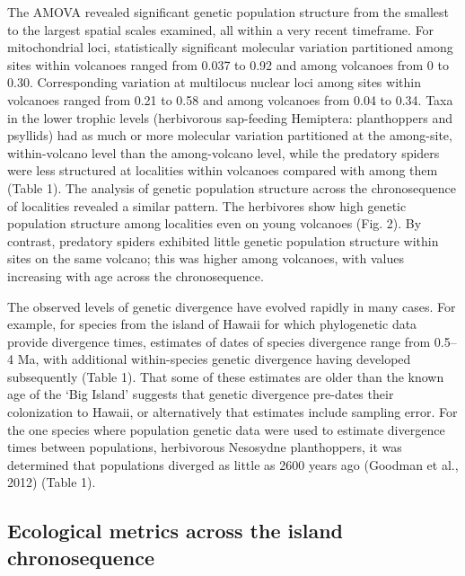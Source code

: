 The AMOVA revealed significant genetic population structure from the
smallest to the largest spatial scales examined, all within a very
recent timeframe. For mitochondrial loci, statistically significant
molecular variation partitioned among sites within volcanoes ranged
from 0.037 to 0.92 and among volcanoes from 0 to 0.30. Corresponding
variation at multilocus nuclear loci among sites within volcanoes
ranged from 0.21 to 0.58 and among volcanoes from 0.04 to 0.34. Taxa
in the lower trophic levels (herbivorous sap-feeding Hemiptera:
planthoppers and psyllids) had as much or more molecular variation
partitioned at the among-site, within-volcano level than the
among-volcano level, while the predatory spiders were less structured
at localities within volcanoes compared with among them (Table 1). The
analysis of genetic population structure across the chronosequence of
localities revealed a similar pattern. The herbivores show high
genetic population structure among localities even on young volcanoes
(Fig. 2). By contrast, predatory spiders exhibited little genetic
population structure within sites on the same volcano; this was higher
among volcanoes, with values increasing with age across the
chronosequence.

The observed levels of genetic divergence have evolved rapidly in many
cases. For example, for species from the island of Hawaii for which
phylogenetic data provide divergence times, estimates of dates of
species divergence range from 0.5–4 Ma, with additional within-species
genetic divergence having developed subsequently (Table 1). That some
of these estimates are older than the known age of the ‘Big Island’
suggests that genetic divergence pre-dates their colonization to
Hawaii, or alternatively that estimates include sampling error. For
the one species where population genetic data were used to estimate
divergence times between populations, herbivorous Nesosydne
planthoppers, it was determined that populations diverged as little as
2600 years ago (Goodman et al., 2012) (Table 1).


\subsection{Ecological metrics across the island chronosequence}


